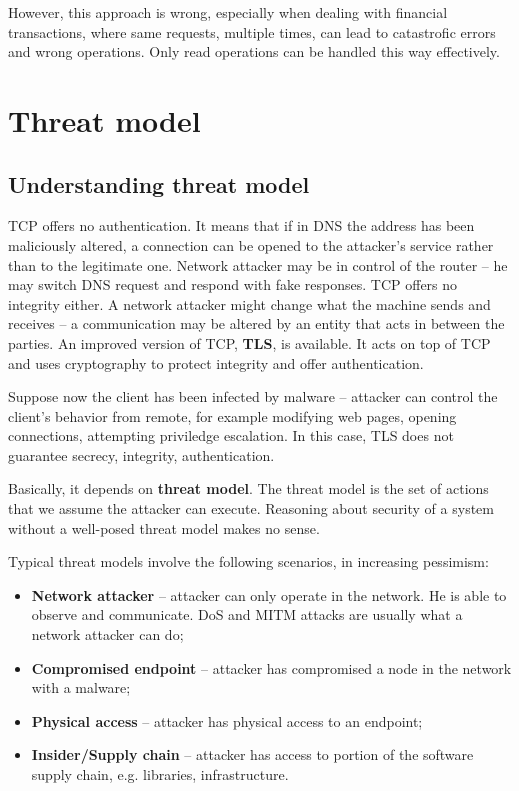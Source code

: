 \documentclass[a4paper, 11pt]{report}
\begin{document}
However, this approach is wrong, especially when dealing with financial
transactions, where same requests, multiple times, can lead to catastrofic
errors and wrong operations. Only read operations can be handled this way
effectively.



\part{Threat model}

\chapter{Understanding threat model}

TCP offers no authentication. It means that if in DNS the address has been
maliciously altered, a connection can be opened to the attacker's service
rather than to the legitimate one. Network attacker may be in control of the
router \--- he may switch DNS request and respond with fake responses. TCP
offers no integrity either. A network attacker might change what the machine
sends and receives \--- a communication may be altered by an entity that acts
in between the parties. An improved version of TCP, \textbf{TLS}, is available.
It acts on top of TCP and uses cryptography to protect integrity and offer
authentication.

Suppose now the client has been infected by malware \--- attacker can control
the client's behavior from remote, for example modifying web pages, opening
connections, attempting priviledge escalation. In this case, TLS does not
guarantee secrecy, integrity, authentication. 

Basically, it depends on \textbf{threat model}. The threat model is the set of
actions that we assume the attacker can execute. Reasoning about security of a
system without a well-posed threat model makes no sense.

Typical threat models involve the following scenarios, in increasing pessimism:
\begin{itemize}
    \item \textbf{Network attacker} \--- attacker can only operate in the
        network. He is able to observe and communicate. DoS and MITM attacks
        are usually what a network attacker can do;
    \item \textbf{Compromised endpoint} \--- attacker has compromised a node in
        the network with a malware;
    \item \textbf{Physical access} \--- attacker has physical access to an
        endpoint;
    \item \textbf{Insider/Supply chain} \--- attacker has access to portion of
        the software supply chain, e.g. libraries, infrastructure.
\end{itemize}
\end{document}
